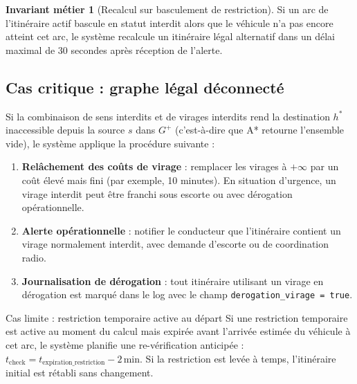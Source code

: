 \documentclass[12pt,a4paper]{article}
\theoremstyle{definition}
\newtheorem{invariant}{Invariant métier}[section]
\theoremstyle{remark}
\begin{document}
\begin{invariant}[Recalcul sur basculement de restriction]
\label{inv:restrition}
Si un arc de l'itinéraire actif bascule en statut interdit
alors que le véhicule n'a pas encore atteint cet arc, le système
recalcule un itinéraire légal alternatif dans un délai maximal de
30 secondes après réception de l'alerte.
\end{invariant}

\subsection{Cas critique : graphe légal déconnecté}

Si la combinaison de sens interdits et de virages interdits rend
la destination $h^*$ inaccessible depuis la source $s$ dans $G^+$
(c'est-à-dire que A* retourne l'ensemble vide), le système applique
la procédure suivante :

\begin{enumerate}[leftmargin=2em, itemsep=4pt]
  \item \textbf{Relâchement des coûts de virage} : remplacer les virages
    à $+\infty$ par un coût élevé mais fini (par exemple, 10 minutes).
    En situation d'urgence, un virage interdit peut être franchi sous
    escorte ou avec dérogation opérationnelle.

  \item \textbf{Alerte opérationnelle} : notifier le conducteur que
    l'itinéraire contient un virage normalement interdit, avec demande
    d'escorte ou de coordination radio.

  \item \textbf{Journalisation de dérogation} : tout itinéraire utilisant
    un virage en dérogation est marqué dans le log avec le champ
    \texttt{derogation\_virage = true}.
\end{enumerate}

\begin{alertbox}{Cas limite : restriction temporaire active au départ}
Si une restriction temporaire est active au moment du calcul mais
expirée avant l'arrivée estimée du véhicule à cet arc, le système
planifie une re-vérification anticipée : $t_\text{check} =
t_\text{expiration\_restriction} - 2\,\text{min}$. Si la restriction
est levée à temps, l'itinéraire initial est rétabli sans changement.
\end{alertbox}

\newpage

\end{document}
